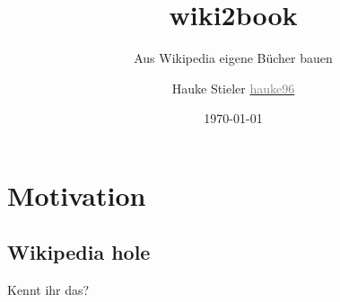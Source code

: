 \documentclass{beamer}
\author[Hauke Stieler]{
	Hauke Stieler\n
	\href{https://github.com/hauke96}{\footnotesize\textcolor{gray}{\faicon{github} hauke96}}
}
\title{wiki2book}
\subtitle{Aus Wikipedia eigene Bücher bauen}
\date{\today}
\begin{document}
	{
		\maketitle
	}


	\section{Motivation}	
	
	\subsection{Wikipedia hole}
	
	\begin{frame}
		\begin{center}
			Kennt ihr das?
		\end{center}
	\end{frame}
\end{document}

